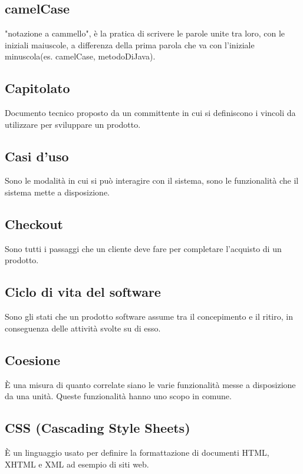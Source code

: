 \section{}

\subsection*{camelCase}
"notazione a cammello", è la pratica di scrivere le parole unite tra loro, con le iniziali maiuscole, a differenza della prima parola che va con l'iniziale minuscola(es. camelCase, metodoDiJava).

\subsection*{Capitolato} Documento tecnico proposto da un committente in cui si definiscono i vincoli da utilizzare per sviluppare un prodotto.

\subsection*{Casi d'uso} Sono le modalità in cui si può interagire con il sistema, sono le funzionalità che il sistema mette a disposizione.

\subsection*{Checkout} Sono tutti i passaggi che un cliente deve fare per completare l'acquisto di un prodotto.

\subsection*{Ciclo di vita del software} Sono gli stati che un prodotto software assume tra il concepimento e il ritiro, in conseguenza delle attività svolte su di esso.

\subsection*{Coesione} È una misura di quanto correlate siano le varie funzionalità messe a disposizione da una unità. Queste funzionalità hanno uno scopo in comune.

\subsection*{CSS (Cascading Style Sheets)} È un linguaggio usato per definire la formattazione di documenti HTML, XHTML e XML ad esempio di siti web.
